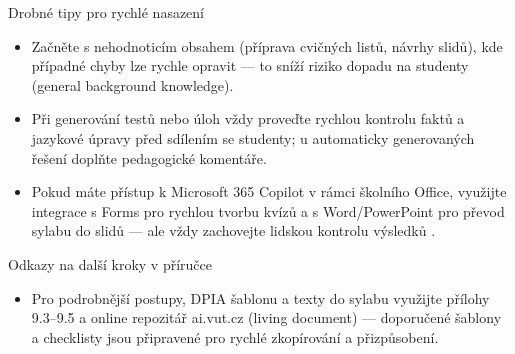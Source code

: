 Drobné tipy pro rychlé nasazení
\begin{itemize}
  \item Začněte s nehodnoticím obsahem (příprava cvičných listů, návrhy slidů), kde případné chyby lze rychle opravit — to sníží riziko dopadu na studenty (general background knowledge).
  \item Při generování testů nebo úloh vždy proveďte rychlou kontrolu faktů a jazykové úpravy před sdílením se studenty; u automaticky generovaných řešení doplňte pedagogické komentáře.
  \item Pokud máte přístup k Microsoft 365 Copilot v rámci školního Office, využijte integrace s Forms pro rychlou tvorbu kvízů a s Word/PowerPoint pro převod sylabu do slidů — ale vždy zachovejte lidskou kontrolu výsledků \cite{kb_ai_101_tipu_pdf_04e4a115_page_3_1,kb_ai_101_tipu_pdf_04e4a115_page_36_1}.
\end{itemize}

Odkazy na další kroky v příručce
\begin{itemize}
  \item Pro podrobnější postupy, DPIA šablonu a texty do sylabu využijte přílohy 9.3–9.5 a online repozitář ai.vut.cz (living document) — doporučené šablony a checklisty jsou připravené pro rychlé zkopírování a přizpůsobení.
\end{itemize}